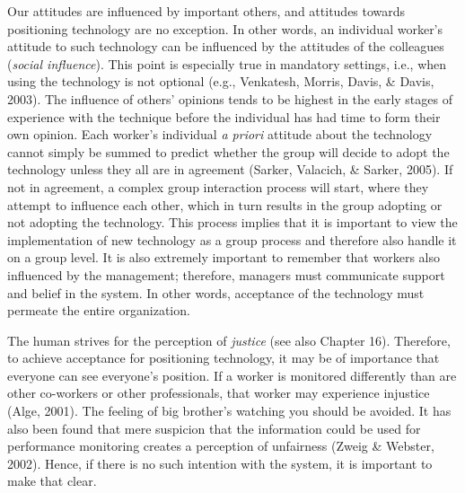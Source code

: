 \documentclass[
  12pt,
]{scrbook}
\begin{document}
Our attitudes are influenced by important others, and attitudes towards positioning technology are no exception. In other words, an individual worker's attitude to such technology can be influenced by the attitudes of the colleagues (\emph{social influence}). This point is especially true in mandatory settings, i.e., when using the technology is not optional (e.g., Venkatesh, Morris, Davis, \& Davis, 2003). The influence of others' opinions tends to be highest in the early stages of experience with the technique before the individual has had time to form their own opinion. Each worker's individual \emph{a priori} attitude about the technology cannot simply be summed to predict whether the group will decide to adopt the technology unless they all are in agreement (Sarker, Valacich, \& Sarker, 2005). If not in agreement, a complex group interaction process will start, where they attempt to influence each other, which in turn results in the group adopting or not adopting the technology. This process implies that it is important to view the implementation of new technology as a group process and therefore also handle it on a group level. It is also extremely important to remember that workers also influenced by the management; therefore, managers must communicate support and belief in the system. In other words, acceptance of the technology must permeate the entire organization.

The human strives for the perception of \emph{justice} (see also Chapter 16). Therefore, to achieve acceptance for positioning technology, it may be of importance that everyone can see everyone's position. If a worker is monitored differently than are other co-workers or other professionals, that worker may experience injustice (Alge, 2001). The feeling of big brother's watching you should be avoided. It has also been found that mere suspicion that the information could be used for performance monitoring creates a perception of unfairness (Zweig \& Webster, 2002). Hence, if there is no such intention with the system, it is important to make that clear.
\end{document}
